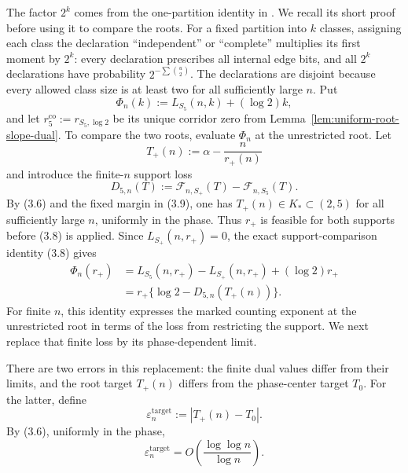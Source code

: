 \documentclass[a4paper,10pt,reqno]{amsart}
\numberwithin{equation}{section}
\theoremstyle{plain}
\theoremstyle{remark}
\begin{document}
The factor \(2^k\) comes from the one-partition identity in
\citet[Proposition~6]{heckel-2025-difference}. We recall its short proof
before using it to compare the roots.  For a fixed
partition into \(k\) classes, assigning each class the declaration
``independent'' or ``complete'' multiplies its first moment by \(2^k\):
every declaration prescribes all internal edge bits, and all \(2^k\)
declarations have probability \(2^{-\sum \binom{u}{2}}\). The declarations
are disjoint because every allowed class size is at least two for all
sufficiently large $n$.
Put
\begin{equation*}
  \Phi_n(k):=L_{S_5}(n,k)+(\log 2)k,
  \tag{5.9}
\end{equation*}
and let $r_5^{\mathrm{co}}:=r_{S_5,\log 2}$ be its unique corridor zero from
Lemma~\ref{lem:uniform-root-slope-dual}. To compare the two roots, evaluate
$\Phi_n$ at the unrestricted root. Let
\[
  T_+(n):=\alpha-\frac{n}{r_+(n)}
\]
and introduce the finite-$n$ support loss
\[
  D_{5,n}(T):=
  \mathcal F_{n,S_+}(T)-\mathcal F_{n,S_5}(T).
\]
By (3.6) and the fixed margin in (3.9), one has
$T_+(n)\in K_*\subset(2,5)$ for all sufficiently large $n$, uniformly in the
phase.  Thus $r_+$ is feasible for both supports before (3.8) is applied.
Since $L_{S_+}(n,r_+)=0$, the exact support-comparison identity (3.8) gives
\begin{equation*}
\begin{aligned}
  \Phi_n(r_+)
  &=L_{S_5}(n,r_+)-L_{S_+}(n,r_+)+(\log 2)r_+\\
  &=r_+\{\log 2-D_{5,n}(T_+(n))\}.
\end{aligned}
\tag{5.9a}
\end{equation*}
For finite $n$, this identity expresses the marked counting exponent at
the unrestricted root in terms of the loss from restricting the support.
We next replace that finite loss by its phase-dependent limit.

There are two errors in this replacement: the finite dual values differ
from their limits, and the root target $T_+(n)$ differs from the phase-center
target $T_0$. For the latter, define
\[
  \varepsilon_n^{\mathrm{target}}
  :=|T_+(n)-T_0|.
\]
By (3.6), uniformly in the phase,
\begin{equation*}
  \varepsilon_n^{\mathrm{target}}
  =O\!\left(\frac{\log\log n}{\log n}\right).
  \tag{5.9b}
\end{equation*}
\end{document}
